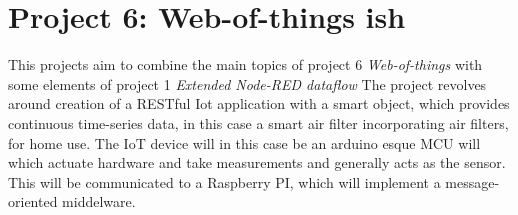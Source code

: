 



\section{Project 6: Web-of-things ish}
This projects aim to combine the main topics of project 6 \textit{Web-of-things} with some
elements of project 1 \textit{Extended Node-RED dataflow} 
The project revolves around creation of a RESTful Iot application with a smart 
object, which provides continuous time-series data, in this case a smart air filter
incorporating air filters, for home use. The IoT device will in this case be an arduino 
esque MCU will which actuate hardware and take measurements and generally acts as the sensor.
This will be communicated to a Raspberry PI, which will implement a message-oriented middelware.\\

